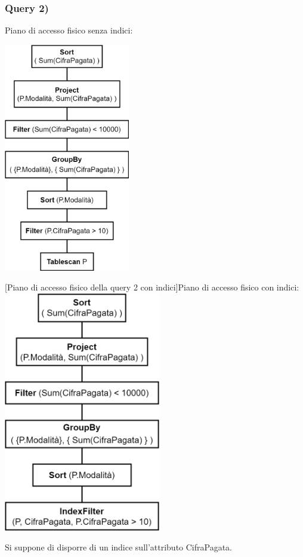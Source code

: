 \documentclass[a4paper,12pt]{article}
\begin{document}
 \subsubsection{ Query 2) }

\vspace{-0.3cm}\begin{minipage}{\textwidth}
\begin{multicols}{2}

\null \vfill
Piano di accesso fisico senza indici:

\vspace{0.3cm}\includegraphics[height=10cm]{ Albero fisico 2.png }
\vfill \null

\columnbreak

 [Piano di accesso fisico della query 2 con indici]{Piano di accesso fisico con indici:}
\includegraphics[height=10.5cm]{ Albero fisico indici 2.png }

Si suppone di disporre di un indice sull'attributo CifraPagata.

\end{multicols}
\end{minipage}
\end{document}
